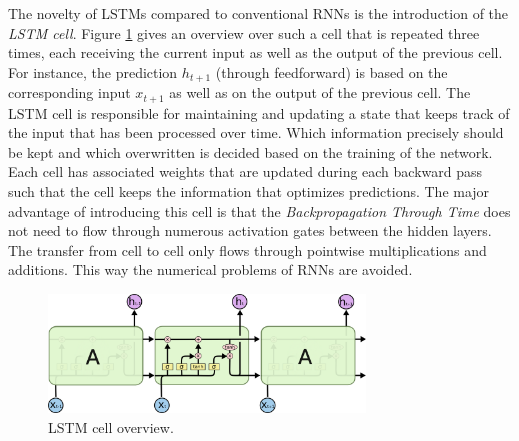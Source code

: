 The novelty of LSTMs compared to conventional RNNs is the introduction of the \textit{LSTM cell}. Figure \ref{fig:lstm} gives an overview over such a cell that is repeated three times, each receiving the current input as well as the output of the previous cell. For instance, the prediction $h_{t+1}$ (through feedforward) is based on the corresponding input $x_{t+1}$ as well as on the output of the previous cell. The LSTM cell is responsible for maintaining and updating a state that keeps track of the input that has been processed over time. Which information precisely should be kept and which overwritten is decided based on the training of the network. Each cell has associated weights that are updated during each backward pass such that the cell keeps the information that optimizes predictions. The major advantage of introducing this cell is that the \textit{Backpropagation Through Time} does not need to flow through numerous activation gates between the hidden layers. The transfer from cell to cell only flows through pointwise multiplications and additions. This way the numerical problems of RNNs are avoided.

\begin{figure}
\centering
\includegraphics[width=0.75\textwidth]{img/lstm}
\caption{LSTM cell overview.\protect\footnotemark}
\label{fig:lstm}
\end{figure}

